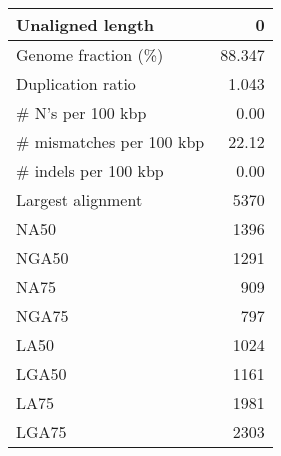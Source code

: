 \documentclass[12pt,a4paper]{article}
\begin{document}
\begin{table}[ht]
\begin{center}
\begin{tabular}{|l*{1}{|r}|}
Unaligned length & 0 \\ \hline
Genome fraction (\%) & 88.347 \\ \hline
Duplication ratio & 1.043 \\ \hline
\# N's per 100 kbp & 0.00 \\ \hline
\# mismatches per 100 kbp & 22.12 \\ \hline
\# indels per 100 kbp & 0.00 \\ \hline
Largest alignment & 5370 \\ \hline
NA50 & 1396 \\ \hline
NGA50 & 1291 \\ \hline
NA75 & 909 \\ \hline
NGA75 & 797 \\ \hline
LA50 & 1024 \\ \hline
LGA50 & 1161 \\ \hline
LA75 & 1981 \\ \hline
LGA75 & 2303 \\ \hline
\end{tabular}
\end{center}
\end{table}
\end{document}
